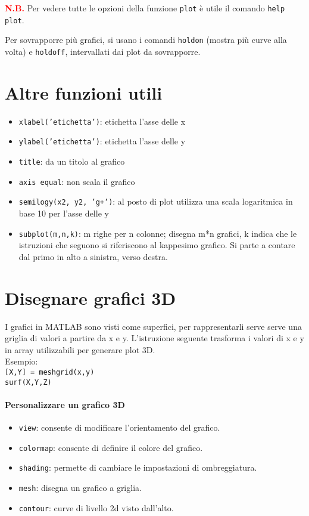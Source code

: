 \textcolor{Red}{\textbf{N.B.}} Per vedere tutte le opzioni della funzione \texttt{plot} è utile il comando 
\texttt{help plot}.

Per sovrapporre più grafici, si usano i comandi \texttt{holdon} (mostra più curve alla volta) e \texttt{holdoff}, 
intervallati dai plot da 
sovrapporre.

\section{Altre funzioni utili}

\begin{itemize}
    \item \texttt{xlabel('etichetta')}: etichetta l'asse delle x
    \item \texttt{ylabel('etichetta')}: etichetta l'asse delle y
    \item \texttt{title}: da un titolo al grafico
    \item \texttt{axis equal}: non scala il grafico
    \item \texttt{semilogy(x2, y2, 'g+')}: al posto di plot utilizza una scala logaritmica in base 10 per l'asse delle y
    \item \texttt{subplot(m,n,k)}: m righe per n colonne; disegna m*n grafici, k indica che le istruzioni che seguono 
    si riferiscono al kappesimo grafico. Si parte a contare dal primo in alto a sinistra, verso destra.
\end{itemize}

\section{Disegnare grafici 3D}
I grafici in MATLAB sono visti come superfici, per rappresentarli serve serve una griglia di valori a partire da x e y.
L'istruzione seguente trasforma i valori di x e y in array utilizzabili per generare plot 3D. \\
 
Esempio:\\
\texttt{[X,Y] = meshgrid(x,y)}\\
\texttt{surf(X,Y,Z)}

\paragraph{Personalizzare un grafico 3D}

\begin{itemize}
    \item \texttt{view}: consente di modificare l'orientamento del grafico.
    \item \texttt{colormap}: consente di definire il colore del grafico.
    \item \texttt{shading}: permette di cambiare le impostazioni di ombreggiatura.
    \item \texttt{mesh}: disegna un grafico a griglia.
    \item \texttt{contour}: curve di livello 2d visto dall'alto.
\end{itemize}